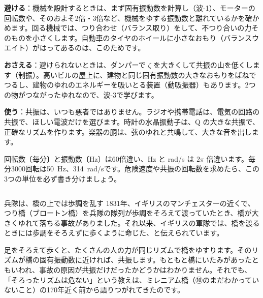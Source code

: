 \begin{phkougaku}
\textbf{避ける}：機械を設計するときは、まず固有振動数を計算し（波-1）、モーターの回転数や、そのおよそ2倍・3倍など、機械をゆする振動数と離れているかを確かめます。回る機械では、つり合わせ（バランス取り）をして、不つり合いの力そのものを小さくします。自動車のタイヤのホイールに小さなおもり（バランスウエイト）がはってあるのは、このためです。

\textbf{おさえる}：避けられないときは、ダンパーで $\zeta$ を大きくして共振の山を低くします（制振）。高いビルの屋上に、建物と同じ固有振動数の大きなおもりをばねでつるし、建物のゆれのエネルギーを吸いとる装置（動吸振器）もあります。2つの物がつながったゆれなので、波-3で学びます。

\textbf{使う}：共振は、いつも悪者ではありません。ラジオや携帯電話は、電気の回路の共振で、ほしい電波だけを選びます。時計の水晶振動子は、Q の大きな共振で、正確なリズムを作ります。楽器の胴は、弦のゆれと共鳴して、大きな音を出します。

\begin{phketa}[ゆする速さの目安]
回転数〔毎分〕と振動数〔Hz〕は60倍違い、Hz と rad/s は $2\pi$ 倍違います。毎分3000回転は\qty{50}{Hz}、\qty{314}{rad/s}です。危険速度や共振の回転数を求めたら、この3つの単位を必ず書き分けましょう。
\end{phketa}
\end{phkougaku}

\begin{column}{兵隊は、橋の上では歩調を乱す}
1831年、イギリスのマンチェスターの近くで、つり橋（ブロートン橋）を兵隊の隊列が歩調をそろえて渡っていたとき、橋が大きくゆれて落ちる事故がありました。それ以来、イギリスの軍隊では、橋を渡るときには歩調をそろえずに歩くように命じた、と伝えられています。

足をそろえて歩くと、たくさんの人の力が同じリズムで橋をゆすります。そのリズムが橋の固有振動数に近ければ、共振します。もともと橋にいたみがあったともいわれ、事故の原因が共振だけだったかどうかはわかりません。それでも、「そろったリズムは危ない」という教えは、ミレニアム橋（⑩のまだわかっていないこと）の170年近く前から語りつがれてきたのです。
\end{column}

